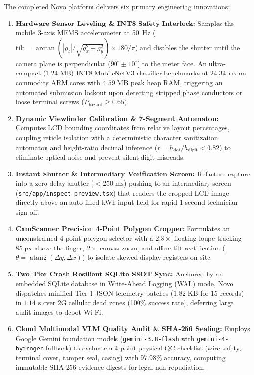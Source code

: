 \documentclass[12pt,a4paper,oneside]{report}
\begin{document}
The completed Novo platform delivers six primary engineering innovations:
\begin{enumerate}
    \item \textbf{Hardware Sensor Leveling \& INT8 Safety Interlock:} Samples the mobile 3-axis MEMS accelerometer at 50~Hz ($\text{tilt} = \arctan(|g_z| / \sqrt{g_x^2 + g_y^2}) \times 180 / \pi$) and disables the shutter until the camera plane is perpendicular ($90^\circ \pm 10^\circ$) to the meter face. An ultra-compact ($1.24\text{~MB}$) INT8 MobileNetV3 classifier benchmarks at $24.34\text{~ms}$ on commodity ARM cores with $4.59\text{~MB}$ peak heap RAM, triggering an automated submission lockout upon detecting stripped phase conductors or loose terminal screws ($P_{\text{hazard}} \ge 0.65$).
    \item \textbf{Dynamic Viewfinder Calibration \& 7-Segment Automaton:} Computes LCD bounding coordinates from relative layout percentages, coupling reticle isolation with a deterministic character sanitization automaton and height-ratio decimal inference ($r = h_{\text{dot}} / h_{\text{digit}} < 0.82$) to eliminate optical noise and prevent silent digit misreads.
    \item \textbf{Instant Shutter \& Intermediary Verification Screen:} Refactors capture into a zero-delay shutter ($<250\text{~ms}$) pushing to an intermediary screen (\texttt{src/app/}\allowbreak\texttt{inspect-preview.tsx}) that renders the cropped LCD image directly above an auto-filled kWh input field for rapid 1-second technician sign-off.
    \item \textbf{CamScanner Precision 4-Point Polygon Cropper:} Formulates an unconstrained 4-point polygon selector with a $2.8\times$ floating loupe tracking $85\text{~px}$ above the finger, $2\times$ canvas zoom, and affine tilt rectification ($\theta = \operatorname{atan2}(\Delta y, \Delta x)$) to isolate skewed display registers on-site.
    \item \textbf{Two-Tier Crash-Resilient SQLite SSOT Sync:} Anchored by an embedded SQLite database in Write-Ahead Logging (WAL) mode, Novo dispatches minified Tier-1 JSON telemetry batches ($1.82\text{~KB}$ for 15 records) in $1.14\text{~s}$ over 2G cellular dead zones (100\% success rate), deferring large audit images to depot Wi-Fi.
    \item \textbf{Cloud Multimodal VLM Quality Audit \& SHA-256 Sealing:} Employs Google Gemini foundation models (\texttt{gemini-3.8-flash} with \texttt{gemini-4-hydrogen} fallback) to evaluate a 4-point physical QC checklist (wire safety, terminal cover, tamper seal, casing) with 97.98\% accuracy, computing immutable SHA-256 evidence digests for legal non-repudiation.
\end{enumerate}
\end{document}
